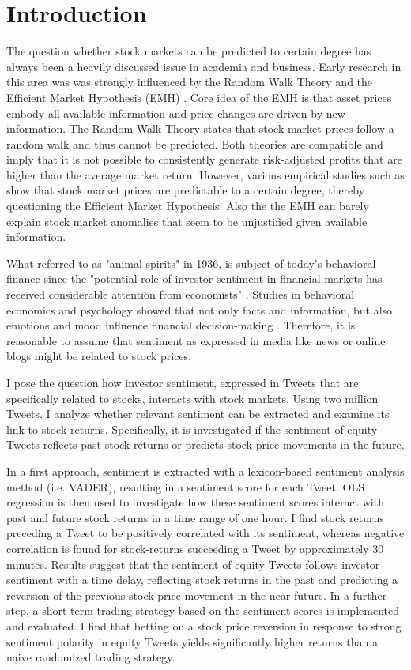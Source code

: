 \documentclass[a4paper,12pt]{article}%
\begin{document}
\section{Introduction}
The question whether stock markets can be predicted to certain degree has always been a heavily discussed issue in academia and business. Early research in this area was was strongly influenced by the Random Walk Theory \citep{Fama1965a, Cootner1964} and the
 Efficient Market Hypothesis (EMH) \citep{Fama1965b, Fama1969}. Core idea of the EMH is that asset prices embody all available information and price changes are driven by new information. The Random Walk Theory states that stock market prices follow a random walk and thus cannot be predicted. Both theories are compatible and imply that it is not possible to consistently generate risk-adjusted profits that are higher than the average market return. However, various empirical studies such as \citet{Butler1992, Gallagher2002, Qian2007} show that stock market prices are predictable to a certain degree, thereby questioning the Efficient Market Hypothesis. Also the the EMH can barely explain stock market anomalies that seem to be unjustified given available information. 

What \citeauthor{Keynes1936} referred to as "animal spirits" in 1936, is subject of today's behavioral finance since the "potential role of investor sentiment in financial markets has received considerable attention from economists" \citep{Karabulut2013}. Studies in behavioral economics and psychology showed that not only facts and information, but also emotions and mood influence financial decision-making \citep{Folsom2003, Rick2008}. Therefore, it is reasonable to assume that sentiment as expressed in media like news or online blogs might be related to stock prices. 

I pose the question how investor sentiment, expressed in Tweets that are specifically related to stocks, interacts with stock markets. Using two million Tweets, I analyze whether relevant sentiment can be extracted and examine its link to stock returns. Specifically, it is investigated if the sentiment of equity Tweets reflects past stock returns or predicts stock price movements in the future. 

In a first approach, sentiment is extracted with a lexicon-based sentiment analysis method (i.e. VADER), resulting in a sentiment score for each Tweet. OLS regression is then used to investigate how these sentiment scores interact with past and future stock returns in a time range of one hour. 
%
I find stock returns preceding a Tweet to be positively correlated with its sentiment, whereas negative correlation is found for stock-returns succeeding a Tweet by approximately 30 minutes. Results suggest that the sentiment of equity Tweets follows investor sentiment with a time delay, reflecting stock returns in the past and predicting a reversion of the previous stock price movement in the near future.
%
In a further step, a short-term trading strategy based on the sentiment scores is implemented and evaluated. I find that betting on a stock price reversion in response to strong sentiment polarity in equity Tweets yields significantly higher returns than a naive randomized trading strategy.
\end{document}
